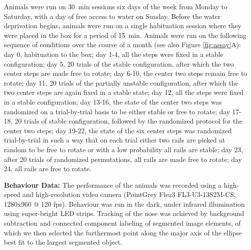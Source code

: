 Animals were run on \SI{30}{\minute} sessions six days of the week from Monday to Saturday, with a day of free access to water on Sunday. Before the water deprivation begins, animals were run on a single habituation session where they were placed in the box for a period of \SI{15}{\minute}. Animals were run on the following sequence of conditions over the course of a month (see also Figure \ref{fig:assay}A): day 0, habituation to the box; day 1-4, all the steps were fixed in a stable configuration; day 5, 20 trials of the stable configuration, after which the two center steps are made free to rotate; day 6-10, the center two steps remain free to rotate; day 11, 20 trials of the partially unstable configuration, after which the two center steps are again fixed in a stable state; day 12, all the steps were fixed in a stable configuration; day 13-16, the state of the center two steps was randomized on a trial-by-trial basis to be either stable or free to rotate; day 17-18, 20 trials of stable configuration, followed by the randomized protocol for the center two steps; day 19-22, the state of the six center steps was randomized trial-by-trial in such a way that on each trial either two rails are picked at random to be free to rotate or with a low probability all rails are stable; day 23, after 20 trials of randomized permutations, all rails are made free to rotate; day 24, all rails are free to rotate.

\textbf{Behaviour Data:} The performance of the animals was recorded using a high-speed and high-resolution video camera (PointGrey Flea3 FL3-U3-13S2M-CS, 1280x960 @ 120 fps). Behaviour was run in the dark, under infrared illumination using super-bright LED strips. Tracking of the nose was achieved by background subtraction and connected component labeling of segmented image elements, of which we then selected the furthermost point along the major axis of the ellipse best fit to the largest segmented object.

